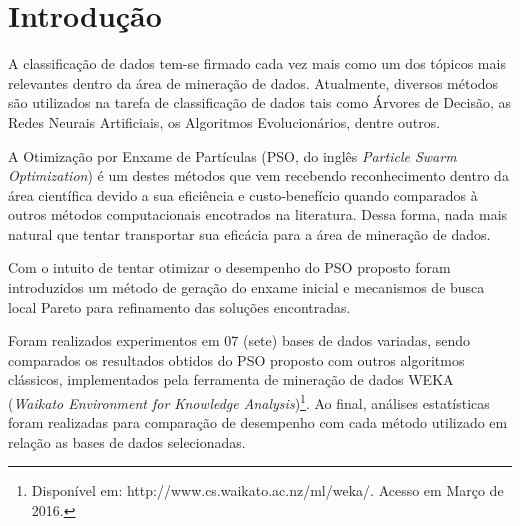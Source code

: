 \documentclass[
	12pt,				%
	openany,			%
	oneside,	
	a4paper,			%
	brazil,				%
	]{unimontes-ppgmsc-abntex2}
\let\oldtextual\textual        %
\renewcommand{\textual}{%
  \oldtextual%
  \pagenumbering{arabic} %
  \setcounter{page}{10}
}
\begin{document}
\listoffigures*
\clearpage

\listoftables*
\clearpage

\textual
\setlength{\headsep}{0.2in}

\chapter[Introdução]{Introdução}
\label{ch: introducao}

A classificação de dados tem-se firmado cada vez mais como um dos tópicos mais relevantes dentro da área de mineração de dados. Atualmente, diversos métodos são utilizados na tarefa de classificação de dados tais como Árvores de Decisão, as Redes Neurais Artificiais, os Algoritmos Evolucionários, dentre outros. 

A Otimização por Enxame de Partículas (PSO, do inglês {\em Particle Swarm Optimization}) é um destes métodos que vem recebendo reconhecimento dentro da área científica devido a sua eficiência e custo-benefício quando comparados à outros métodos computacionais encotrados na literatura. Dessa forma, nada mais natural que tentar transportar sua eficácia para a área de mineração de dados. 

Com o intuito de tentar otimizar o desempenho do PSO proposto foram introduzidos um método de geração do enxame inicial e mecanismos de busca local Pareto para refinamento das soluções encontradas.

Foram realizados experimentos em 07 (sete) bases de dados variadas, sendo comparados os resultados obtidos do PSO proposto com outros algoritmos clássicos, implementados pela ferramenta de mineração de dados WEKA (\textit{Waikato Environment for Knowledge Analysis})\footnote{Disponível em: http://www.cs.waikato.ac.nz/ml/weka/. Acesso em Março de 2016.}. Ao final, análises estatísticas foram realizadas para comparação de desempenho com cada método utilizado em relação as bases de dados selecionadas.
\end{document}
